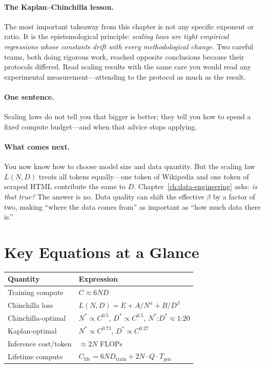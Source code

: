 \paragraph{The Kaplan--Chinchilla lesson.} The most important takeaway from this chapter is not any specific exponent or ratio. It is the epistemological principle: \emph{scaling laws are tight empirical regressions whose constants drift with every methodological change.} Two careful teams, both doing rigorous work, reached opposite conclusions because their protocols differed. Read scaling results with the same care you would read any experimental measurement---attending to the protocol as much as the result.

\paragraph{One sentence.} Scaling laws do not tell you that bigger is better; they tell you how to spend a fixed compute budget---and when that advice stops applying.

\paragraph{What comes next.} You now know how to choose model size and data quantity. But the scaling law $L(N,D)$ treats all tokens equally---one token of Wikipedia and one token of scraped HTML contribute the same to $D$. Chapter~\ref{ch:data-engineering} asks: \emph{is that true?} The answer is no. Data quality can shift the effective $\beta$ by a factor of two, making ``where the data comes from'' as important as ``how much data there is.''


\section*{Key Equations at a Glance}

\begin{center}
\begin{tabularx}{\textwidth}{@{}p{5cm}X@{}}
\toprule
\textbf{Quantity} & \textbf{Expression} \\
\midrule
Training compute & $C \approx 6ND$ \\
Chinchilla loss & $L(N,D) = E + A/N^\alpha + B/D^\beta$ \\
Chinchilla-optimal & $N^* \propto C^{0.5}$, $D^* \propto C^{0.5}$, $N^*$:$D^* \approx 1$:$20$ \\
Kaplan-optimal & $N^* \propto C^{0.73}$, $D^* \propto C^{0.27}$ \\
Inference cost/token & $\approx 2N$ FLOPs \\
Lifetime compute & $C_{\text{life}} = 6ND_{\text{train}} + 2N \cdot Q \cdot T_{\text{gen}}$ \\
\bottomrule
\end{tabularx}
\end{center}


